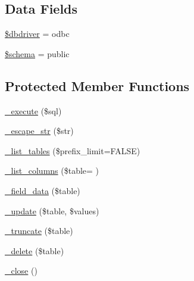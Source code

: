 \subsection*{Data Fields}
\begin{DoxyCompactItemize}
\item 
\hyperlink{class_c_i___d_b__odbc__driver_a0cde2a16322a023d040aa7f725877597}{\$dbdriver} = \textquotesingle{}odbc\textquotesingle{}
\item 
\hyperlink{class_c_i___d_b__odbc__driver_a83022b1d70799d2bde3d64dca9cb40ee}{\$schema} = \textquotesingle{}public\textquotesingle{}
\end{DoxyCompactItemize}
\subsection*{Protected Member Functions}
\begin{DoxyCompactItemize}
\item 
\hyperlink{class_c_i___d_b__odbc__driver_a114ab675d89bf8324a41785fb475e86d}{\+\_\+execute} (\$sql)
\item 
\hyperlink{class_c_i___d_b__odbc__driver_af8ef0237bfcdb19215b63fff769e7a55}{\+\_\+escape\+\_\+str} (\$str)
\item 
\hyperlink{class_c_i___d_b__odbc__driver_a435c0f3ce54fe7daa178baa8532ebd54}{\+\_\+list\+\_\+tables} (\$prefix\+\_\+limit=F\+A\+L\+S\+E)
\item 
\hyperlink{class_c_i___d_b__odbc__driver_a2a81bb476a5c76fe6f763b0557c1e4c2}{\+\_\+list\+\_\+columns} (\$table= \textquotesingle{}\textquotesingle{})
\item 
\hyperlink{class_c_i___d_b__odbc__driver_a95247d9671893adc3444cb184ad32ea1}{\+\_\+field\+\_\+data} (\$table)
\item 
\hyperlink{class_c_i___d_b__odbc__driver_a2540b03a93fa73ae74c10d0e16fc073e}{\+\_\+update} (\$table, \$values)
\item 
\hyperlink{class_c_i___d_b__odbc__driver_aa029600528fc1ce660a23ff4b4667f95}{\+\_\+truncate} (\$table)
\item 
\hyperlink{class_c_i___d_b__odbc__driver_a133ea8446ded52589bd22cc9163d0896}{\+\_\+delete} (\$table)
\item 
\hyperlink{class_c_i___d_b__odbc__driver_a4d9082658000e5ede8312067c6dda9db}{\+\_\+close} ()
\end{DoxyCompactItemize}
